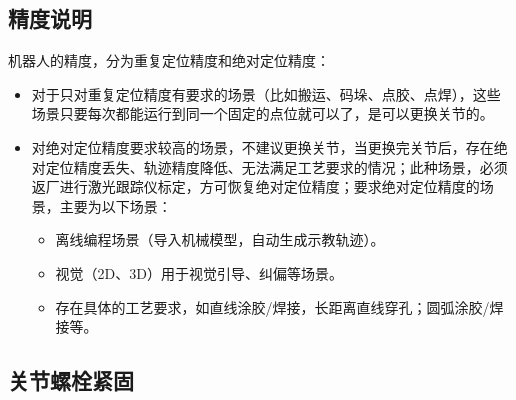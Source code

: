 \documentclass[a4paper,11pt,english,openany,oneside]{sphinxmanual}
\begin{document}
\subsection{精度说明}
\label{\detokenize{_u66f4_u6362_u5173_u8282:id3}}\label{\detokenize{_u66f4_u6362_u5173_u8282:id4}}
\sphinxAtStartPar
机器人的精度，分为重复定位精度和绝对定位精度：
\begin{itemize}
\item {} 
\sphinxAtStartPar
对于只对重复定位精度有要求的场景（比如搬运、码垛、点胶、点焊），这些场景只要每次都能运行到同一个固定的点位就可以了，是可以更换关节的。

\item {} 
\sphinxAtStartPar
对绝对定位精度要求较高的场景，不建议更换关节，当更换完关节后，存在绝对定位精度丢失、轨迹精度降低、无法满足工艺要求的情况；此种场景，必须返厂进行激光跟踪仪标定，方可恢复绝对定位精度；要求绝对定位精度的场景，主要为以下场景：
\begin{itemize}
\item {} 
\sphinxAtStartPar
离线编程场景（导入机械模型，自动生成示教轨迹）。

\item {} 
\sphinxAtStartPar
视觉（2D、3D）用于视觉引导、纠偏等场景。

\item {} 
\sphinxAtStartPar
存在具体的工艺要求，如直线涂胶/焊接，长距离直线穿孔；圆弧涂胶/焊接等。

\end{itemize}

\end{itemize}


\subsection{关节螺栓紧固}
\label{\detokenize{_u66f4_u6362_u5173_u8282:id5}}\label{\detokenize{_u66f4_u6362_u5173_u8282:id6}}
\end{document}
